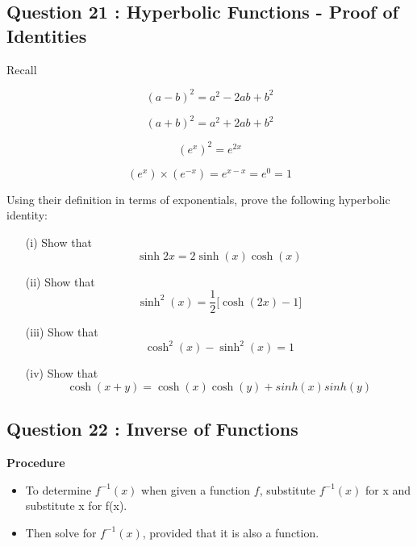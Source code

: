 \documentclass[]{article}
\begin{document}
	\subsection*{Question 21 : Hyperbolic Functions - Proof of Identities}
	Recall 
	\begin{framed}
		\begin{multicols}{2}
			\[ (a-b)^2 = a^2 -2ab +b^2 \]
			
			\[ (a+b)^2 = a^2 + 2ab +b^2 \]
			
			\[ (e^x)^2  = e^{2x} \]
			
			\[  (e^x) \times (e^{-x}) = e^{x-x} =e^0  =1  \]
		\end{multicols}
	\end{framed}
\noindent	Using their definition in terms of exponentials, prove the following 
	hyperbolic identity:
	\begin{itemize}
			\item[(i)] Show that \[\sinh2x = 2\sinh(x) \cosh(x) \]
		\item[(ii)] Show that \[ \sinh^2(x) = \frac{1}{2} \big[ \cosh(2x)-1 \big]\]
			\item[(iii)] Show that \[ \cosh^2(x) - \sinh^2(x) = 1\]
		\item[(iv)] Show that \[ \cosh(x+y) = \cosh(x)\cosh(y) + sinh(x)sinh(y)\]
	
		
	\end{itemize}
\newpage



	

	\subsection*{Question 22 : Inverse of Functions}
	
	\begin{framed}
		\textbf{Procedure}
		\begin{itemize}
			\item	To determine $f^{-1}(x)$ when given a function $f$, substitute $f^{-1}(x)$ for x and substitute x for f(x).
			\item Then solve for $f^{-1}(x)$, provided that it is also a function.
		\end{itemize}
	\end{framed}
	
\end{document}
